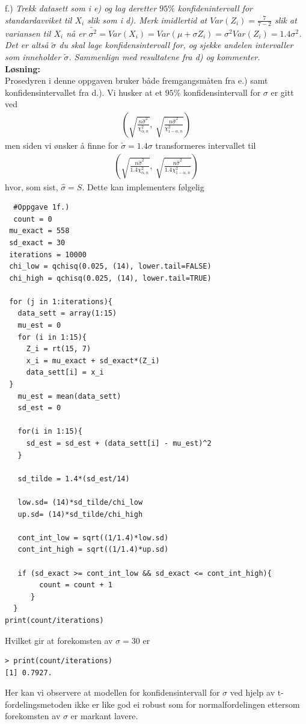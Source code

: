 \documentclass[12pt,
               a4paper,
               article,
               oneside,
               oldfontcommands,
               norsk]{memoir}
\begin{document}
f.) \emph{Trekk datasett som i e) og lag deretter $95\%$ konfidenintervall for standardavviket til $X_i$ slik som i d). Merk imidlertid at $Var(Z_i) = \frac{7}{7-2}$ slik at
variansen til $X_i$ nå er $\tilde{\sigma^2} = Var(X_i) = Var(\mu + \sigma Z_i) = \sigma^2Var(Z_i) = 1.4\sigma^2$.
Det er altså $\tilde{\sigma}$ du skal lage konfidensintervall for, og sjekke andelen intervaller som inneholder $\tilde{\sigma}$. Sammenlign med resultatene fra d) og kommenter.} \vspace{4mm}\\ 
\textbf{Løsning:}\vspace{4mm}\\ 
Prosedyren i denne oppgaven bruker både fremgangsmåten fra e.) samt konfidensintervallet fra d.). Vi husker at et $95 \%$ konfidensintervall for $\sigma$ er gitt ved 
\begin{align*}
\left( \sqrt{\frac{n \hat{\sigma}^2}{\chi^{2}_{\alpha, n}}}, \ \sqrt{\frac{n \hat{\sigma}^2}{\chi^{2}_{1- \alpha, n}}} \right)
\end{align*}
men siden vi ønsker å finne for $\tilde{\sigma} = 1.4 \sigma$ transformeres intervallet til 
\begin{align*}
  \left( \sqrt{\frac{n \hat{\sigma}^2}{1.4 \chi^{2}_{\alpha, n}}}, \ \sqrt{\frac{n \hat{\sigma}^2}{1.4 \chi^{2}_{1- \alpha, n}}} \right)
\end{align*}
hvor, som sist, $\hat{\sigma} = S$. Dette kan implementers følgelig 
\begin{lstlisting}
  #Oppgave 1f.)
  count = 0
 mu_exact = 558
 sd_exact = 30
 iterations = 10000
 chi_low = qchisq(0.025, (14), lower.tail=FALSE)
 chi_high = qchisq(0.025, (14), lower.tail=TRUE)

 for (j in 1:iterations){
   data_sett = array(1:15)
   mu_est = 0
   for (i in 1:15){
     Z_i = rt(15, 7)
     x_i = mu_exact + sd_exact*(Z_i)
     data_sett[i] = x_i
 }
   mu_est = mean(data_sett)
   sd_est = 0

   for(i in 1:15){
     sd_est = sd_est + (data_sett[i] - mu_est)^2
   }

   sd_tilde = 1.4*(sd_est/14)

   low.sd= (14)*sd_tilde/chi_low
   up.sd= (14)*sd_tilde/chi_high

   cont_int_low = sqrt((1/1.4)*low.sd)
   cont_int_high = sqrt((1/1.4)*up.sd)

   if (sd_exact >= cont_int_low && sd_exact <= cont_int_high){
        count = count + 1
      }
  }
print(count/iterations)
  \end{lstlisting}
  Hvilket gir at forekomsten av $\sigma = 30$ er 
  \begin{verbatim}
> print(count/iterations)
[1] 0.7927.
  \end{verbatim}
Her kan vi observere at modellen for konfidensintervall for $\sigma$ ved hjelp av t-fordelingsmetoden ikke er like god ei robust som for normalfordelingen ettersom forekomsten av $\sigma$ er markant lavere.
\end{document}
